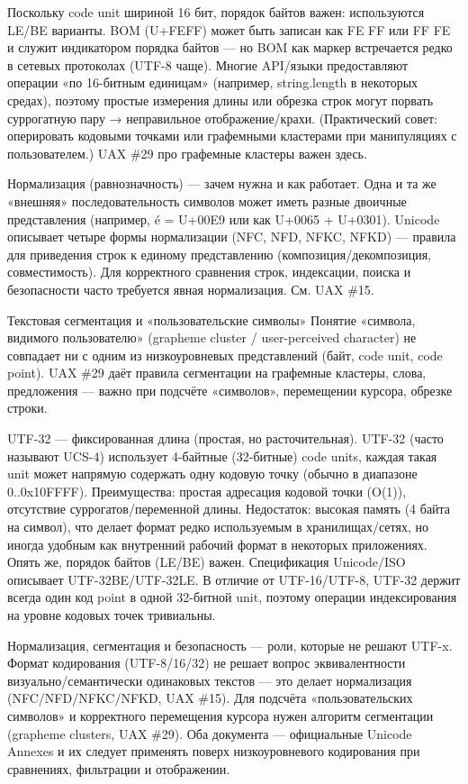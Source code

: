 \documentclass{ou}
\begin{document}
Поскольку code unit шириной 16 бит, порядок байтов важен: используются LE/BE варианты. BOM (U+FEFF) может быть записан как FE FF или FF FE и служит индикатором порядка байтов — но BOM как маркер встречается редко в сетевых протоколах (UTF-8 чаще). Многие API/языки предоставляют операции «по 16-битным единицам» (например, string.length в некоторых средах), поэтому простые измерения длины или обрезка строк могут порвать суррогатную пару → неправильное отображение/крахи. (Практический совет: оперировать кодовыми точками или графемными кластерами при манипуляциях с пользователем.) UAX \#29 про графемные кластеры важен здесь. 

Нормализация (равнозначность) — зачем нужна и как работает. Одна и та же «внешняя» последовательность символов может иметь разные двоичные представления (например, é = U+00E9 или как U+0065 + U+0301). Unicode описывает четыре формы нормализации (NFC, NFD, NFKC, NFKD) — правила для приведения строк к единому представлению (композиция/декомпозиция, совместимость). Для корректного сравнения строк, индексации, поиска и безопасности часто требуется явная нормализация. См. UAX \#15. 

Текстовая сегментация и «пользовательские символы» Понятие «символа, видимого пользователю» (grapheme cluster / user-perceived character) не совпадает ни с одним из низкоуровневых представлений (байт, code unit, code point). UAX \#29 даёт правила сегментации на графемные кластеры, слова, предложения — важно при подсчёте «символов», перемещении курсора, обрезке строки. 

UTF-32 — фиксированная длина (простая, но расточительная). UTF-32 (часто называют UCS-4) использует 4-байтные (32-битные) code units, каждая такая unit может напрямую содержать одну кодовую точку (обычно в диапазоне 0..0x10FFFF). Преимущества: простая адресация кодовой точки (O(1)), отсутствие суррогатов/переменной длины. Недостаток: высокая память (4 байта на символ), что делает формат редко используемым в хранилищах/сетях, но иногда удобным как внутренний рабочий формат в некоторых приложениях. Опять же, порядок байтов (LE/BE) важен. Спецификация Unicode/ISO описывает UTF-32BE/UTF-32LE. В отличие от UTF-16/UTF-8, UTF-32 держит всегда один код point в одной 32-битной unit, поэтому операции индексирования на уровне кодовых точек тривиальны.

Нормализация, сегментация и безопасность — роли, которые не решают UTF-x. Формат кодирования (UTF-8/16/32) не решает вопрос эквивалентности визуально/семантически одинаковых текстов — это делает нормализация (NFC/NFD/NFKC/NFKD, UAX \#15). Для подсчёта «пользовательских символов» и корректного перемещения курсора нужен алгоритм сегментации (grapheme clusters, UAX \#29). Оба документа — официальные Unicode Annexes и их следует применять поверх низкоуровневого кодирования при сравнениях, фильтрации и отображении. 
\newpage
\end{document}
